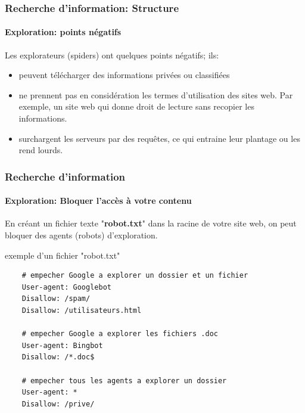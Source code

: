 \documentclass{beamer}
\begin{document}
\begin{frame}
\frametitle{Recherche d'information: Structure}
\framesubtitle{Exploration: points négatifs}

Les explorateurs (spiders) ont quelques points négatifs; ils:
\begin{itemize}
	\item peuvent télécharger des informations privées ou classifiées
	\item ne prennent pas en considération les termes d'utilisation des sites web. 
	Par exemple, un site web qui donne droit de lecture sans recopier les informations. 
	\item surchargent les serveurs par des requêtes, ce qui entraine leur plantage ou les rend lourds.
\end{itemize}

\end{frame}

\begin{frame}[fragile]
\frametitle{Recherche d'information}
\framesubtitle{Exploration: Bloquer l'accès à votre contenu}


En créant un fichier texte "\textbf{robot.txt}" dans la racine de votre site web, on peut bloquer des agents (robots) d'exploration.

%	

\begin{exampleblock}{exemple d'un fichier "robot.txt"}
	\scriptsize\bfseries
	\begin{lstlisting}
	# empecher Google a explorer un dossier et un fichier
	User-agent: Googlebot
	Disallow: /spam/ 
	Disallow: /utilisateurs.html
	
	# empecher Google a explorer les fichiers .doc 
	User-agent: Bingbot
	Disallow: /*.doc$ 
	
	# empecher tous les agents a explorer un dossier
	User-agent: *
	Disallow: /prive/
	\end{lstlisting}
\end{exampleblock}


\end{frame}
\end{document}
